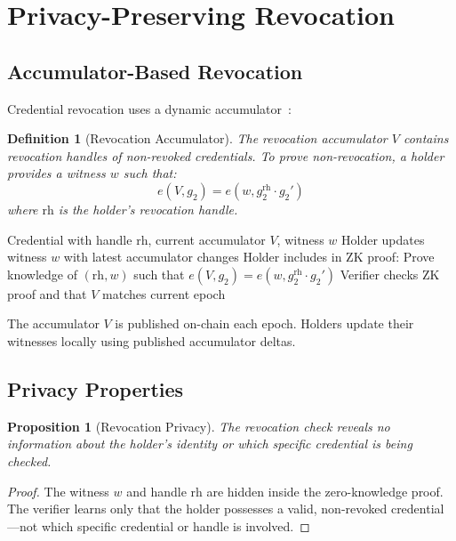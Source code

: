 \documentclass[11pt,a4paper]{article}
\newtheorem{definition}{Definition}[section]
\newtheorem{proposition}{Proposition}[section]
\begin{document}
\section{Privacy-Preserving Revocation}
\label{sec:revocation}

\subsection{Accumulator-Based Revocation}

Credential revocation uses a dynamic
accumulator~\cite{camenisch2002dynamic}:

\begin{definition}[Revocation Accumulator]
    The revocation accumulator $V$ contains revocation handles of
    \emph{non-revoked} credentials.  To prove non-revocation, a holder
    provides a witness $w$ such that:
    \[
        e(V, g_2) = e(w, g_2^{\mathrm{rh}} \cdot g_2')
    \]
    where $\mathrm{rh}$ is the holder's revocation handle.
\end{definition}

\begin{algorithm}[H]
\caption{Revocation Check in Proof}
\label{alg:revoke}
\begin{algorithmic}[1]
\Require Credential with handle $\mathrm{rh}$, current accumulator $V$,
    witness $w$
\State Holder updates witness $w$ with latest accumulator changes
\State Holder includes in ZK proof:
    \Statex \quad Prove knowledge of $(\mathrm{rh}, w)$ such that
    \Statex \quad $e(V, g_2) = e(w, g_2^{\mathrm{rh}} \cdot g_2')$
\State Verifier checks ZK proof and that $V$ matches current epoch
\end{algorithmic}
\end{algorithm}

The accumulator $V$ is published on-chain each epoch.  Holders update
their witnesses locally using published accumulator deltas.

\subsection{Privacy Properties}

\begin{proposition}[Revocation Privacy]
    The revocation check reveals no information about the holder's
    identity or which specific credential is being checked.
\end{proposition}

\begin{proof}
    The witness $w$ and handle $\mathrm{rh}$ are hidden inside the
    zero-knowledge proof.  The verifier learns only that the holder
    possesses a valid, non-revoked credential---not which specific
    credential or handle is involved.
\end{proof}
\end{document}
